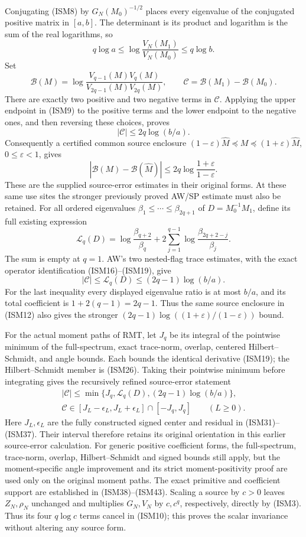 Conjugating (ISM8) by \(G_N(M_0)^{-1/2}\) places every
eigenvalue of the conjugated positive matrix in \([a,b]\).
The determinant is its product and logarithm is the sum of
the real logarithms, so
\[
 q\log a\leq\log\frac{V_N(M_1)}{V_N(M_0)}
       \leq q\log b.
 \tag{ISM9}
\]
Set
\[
 \mathcal B(M)=
 \log\frac{V_{q-1}(M)V_q(M)}{V_{2q-1}(M)V_{2q}(M)},
 \qquad \mathcal C=\mathcal B(M_1)-\mathcal B(M_0).
 \tag{ISM10}
\]
There are exactly two positive and two negative terms in
\(\mathcal C\).  Applying the upper endpoint in (ISM9) to
the positive terms and the lower endpoint to the negative
ones, and then reversing these choices, proves
\[
 |\mathcal C|\leq2q\log(b/a).
 \tag{ISM11}
\]
Consequently a certified common source enclosure
\((1-\varepsilon)\widehat M\preceq M\preceq
(1+\varepsilon)\widehat M\), \(0\leq\varepsilon<1\), gives
\[
 |\mathcal B(M)-\mathcal B(\widehat M)|
 \leq2q\log\frac{1+\varepsilon}{1-\varepsilon}.
 \tag{ISM12}
\]
These are the supplied source-error estimates in their
original forms.  At these same use sites the stronger
previously proved AW/SP estimate must also be retained.
For all ordered eigenvalues
\(\beta_1\leq\cdots\leq\beta_{2q+1}\) of
\(D=M_0^{-1}M_1\), define its full existing expression
\[
 \mathcal L_q(D)=\log\frac{\beta_{q+2}}{\beta_q}
       +2\sum_{j=1}^{q-1}
              \log\frac{\beta_{2q+2-j}}{\beta_j}.
\]
The sum is empty at \(q=1\).  AW's two nested-flag
trace estimates, with the exact operator identification
(ISM16)--(ISM19), give
\[
 |\mathcal C|\leq\mathcal L_q(D)
             \leq(2q-1)\log(b/a).
\]
For the last inequality every displayed eigenvalue ratio
is at most \(b/a\), and its total coefficient is
\(1+2(q-1)=2q-1\).  Thus the same source enclosure in
(ISM12) also gives the stronger
\((2q-1)\log((1+\varepsilon)/(1-\varepsilon))\)
bound.

For the actual moment paths of RMT, let \(J_q\) be its
integral of the pointwise minimum of the full-spectrum,
exact trace-norm, overlap, centered Hilbert--Schmidt,
and angle bounds.  Each bounds the identical derivative
(ISM19); the Hilbert--Schmidt member is (ISM26).
Taking their pointwise minimum before integrating gives
the recursively refined source-error statement
\[
 \begin{gathered}
 |\mathcal C|\leq
 \min\{J_q,\mathcal L_q(D),(2q-1)\log(b/a)\},\\
 \mathcal C\in
 [J_L-\epsilon_L,J_L+\epsilon_L]\cap[-J_q,J_q]
 \qquad(L\geq0).
 \end{gathered}
\]
Here \(J_L,\epsilon_L\) are the fully constructed signed
center and residual in (ISM31)--(ISM37).  Their interval
therefore retains its original orientation in this earlier
source-error calculation.  For generic positive coefficient
forms, the full-spectrum, trace-norm, overlap,
Hilbert--Schmidt and signed bounds still apply, but the
moment-specific angle improvement and its strict
moment-positivity proof are used only on the original
moment paths.  The exact primitive and coefficient
support are established in (ISM38)--(ISM43).
Scaling a source by \(c>0\) leaves \(Z_N,\rho_N\) unchanged
and multiplies \(G_N,V_N\) by \(c,c^q\), respectively,
directly by (ISM3).  Thus its four \(q\log c\) terms cancel
in (ISM10); this proves the scalar invariance without
altering any source form.

